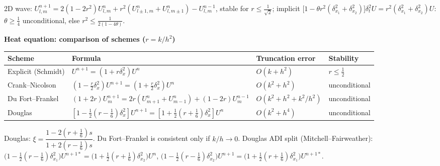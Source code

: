 \documentclass[10pt,a4paper]{article}
\newcommand{\head}[1]{\par\smallskip\noindent\textbf{\color{blue!50!black}#1}\par\nobreak}
\begin{document}
2D wave:
\(U_{l,m}^{n+1}=2(1-2r^2)U_{l,m}^n+r^2(U_{l\pm1,m}^n+U_{l,m\pm1}^n)-U_{l,m}^{n-1}\), stable for \(r\le\frac1{\sqrt2}\);
implicit \(\bigl[1-\theta r^2(\delta_{x_1}^2+\delta_{x_2}^2)\bigr]\delta_t^2U=r^2(\delta_{x_1}^2+\delta_{x_2}^2)U\):
\(\theta\ge\frac14\) unconditional, else \(r^2\le\frac1{2(1-4\theta)}\).

\head{Heat equation: comparison of schemes (\(r=k/h^2\))}
\begin{center}
\renewcommand{\arraystretch}{1.35}
\begin{tabular}{@{}llll@{}}
\toprule
Scheme & Formula & Truncation error & Stability\\
\midrule
Explicit (Schmidt) & \(U^{n+1}=(1+r\delta_x^2)U^n\) & \(O(k+h^2)\) & \(r\le\frac12\)\\
Crank--Nicolson & \((1-\frac r2\delta_x^2)U^{n+1}=(1+\frac r2\delta_x^2)U^n\) & \(O(k^2+h^2)\) & unconditional\\
Du Fort--Frankel & \((1+2r)U_m^{n+1}=2r(U_{m+1}^n+U_{m-1}^n)+(1-2r)U_m^{n-1}\) & \(O(k^2+h^2+k^2/h^2)\) & unconditional\\
Douglas & \([1-\frac12(r-\frac16)\delta_x^2]U^{n+1}=[1+\frac12(r+\frac16)\delta_x^2]U^n\) & \(O(k^2+h^4)\) & unconditional\\
\bottomrule
\end{tabular}
\end{center}
Douglas: \(\xi=\dfrac{1-2(r+\frac16)s}{1+2(r-\frac16)s}\).\;
Du Fort--Frankel is consistent only if \(k/h\to0\).\;
Douglas ADI split (Mitchell--Fairweather):
\(\bigl(1-\tfrac12(r-\tfrac16)\delta_{x_1}^2\bigr)U^{n+1*}=\bigl(1+\tfrac12(r+\tfrac16)\delta_{x_2}^2\bigr)U^n\),\;
\(\bigl(1-\tfrac12(r-\tfrac16)\delta_{x_2}^2\bigr)U^{n+1}=\bigl(1+\tfrac12(r+\tfrac16)\delta_{x_1}^2\bigr)U^{n+1*}\).
\end{document}
